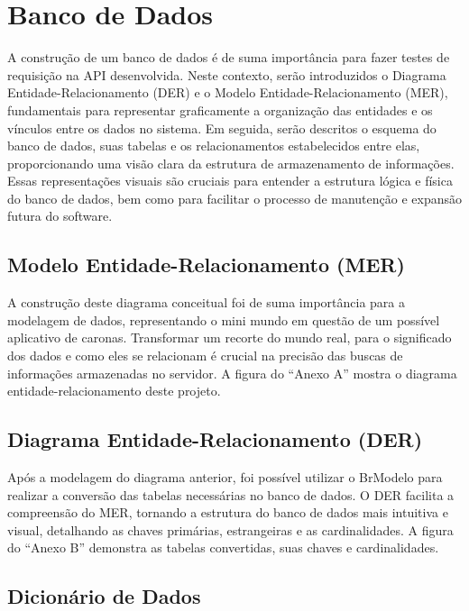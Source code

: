 \section{Banco de Dados}

A construção de um banco de dados é de suma importância para fazer testes de requisição na API desenvolvida. Neste contexto, serão introduzidos o Diagrama Entidade-Relacionamento (DER) e o Modelo Entidade-Relacionamento (MER), fundamentais para representar graficamente a organização das entidades e os vínculos entre os dados no sistema. Em seguida, serão descritos o esquema do banco de dados, suas tabelas e os relacionamentos estabelecidos entre elas, proporcionando uma visão clara da estrutura de armazenamento de informações. Essas representações visuais são cruciais para entender a estrutura lógica e física do banco de dados, bem como para facilitar o processo de manutenção e expansão futura do software.

\subsection{Modelo Entidade-Relacionamento (MER)}

A construção deste diagrama conceitual foi de suma importância para a modelagem de dados, representando o mini mundo em questão de um possível aplicativo de caronas. Transformar um recorte do mundo real, para o significado dos dados e como eles se relacionam é crucial na precisão das buscas de informações armazenadas no servidor. A figura do ``Anexo A'' mostra o diagrama entidade-relacionamento deste projeto.


\subsection{Diagrama Entidade-Relacionamento (DER)}

Após a modelagem do diagrama anterior, foi possível utilizar o BrModelo para realizar a conversão das tabelas necessárias no banco de dados. O DER facilita a compreensão do MER, tornando a estrutura do banco de dados mais intuitiva e visual, detalhando as chaves primárias, estrangeiras e as cardinalidades. A figura do ``Anexo B'' demonstra as tabelas convertidas, suas chaves e cardinalidades.

\subsection{Dicionário de Dados}

